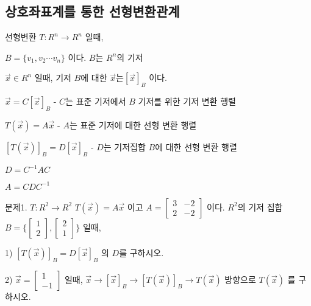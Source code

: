 \newpage
\subsection{상호좌표계를 통한 선형변환관계}
\begin{theorem}
선형변환 $T: R^n \rightarrow R^n$ 일때,

$B = \{ v_1, v_2 \cdots v_n  \}$ 이다. $B$는 $R^n$의 기저

$\vec{x} \in R^n$ 일때, 기저 $B$에 대한 $\vec{x} 는 [\vec{x}]_B$ 이다.

$\vec{x} = C[\vec{x}]_B$ - $C$는 표준 기저에서 $B$ 기저를 위한 기저 변환 행렬

$T(\vec{x}) = A\vec{x}$ - $A$는 표준 기저에 대한 선형 변환 행렬

$[T(\vec{x})]_B = D[\vec{x}]_B$ - $D$는 기저집합 $B$에 대한 선형 변환 행렬

$D = C^{-1}AC$

$A = CDC^{-1}$
\end{theorem}




\newpage
문제1. $T: R^2 \rightarrow R^2$   $T(\vec{x}) = A\vec{x}$ 이고 $A=\begin{bmatrix} 3 & -2 \\ 2 & -2 \end{bmatrix}$ 이다. $R^2$의 기저 집합 $B = \{ \begin{bmatrix} 1 \\ 2\end{bmatrix}, \begin{bmatrix} 2 \\ 1\end{bmatrix} \}$ 일때, 

1) $[T(\vec{x})]_B = D[\vec{x}]_B$ 의 $D$를 구하시오.

2) $\vec{x}=\begin{bmatrix}1 \\ -1 \end{bmatrix}$ 일때, $\vec{x} \rightarrow [\vec{x}]_B \rightarrow [T(\vec{x})]_B \rightarrow T(\vec{x})$ 방향으로 $T(\vec{x})$ 를 구하시오.

\newpage
